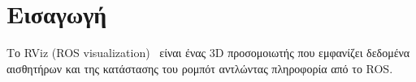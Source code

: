 \section{Εισαγωγή}
Το RViz (ROS visualization)~\cite{rviz} είναι ένας 3D προσομοιωτής που εμφανίζει δεδομένα αισθητήρων και της κατάστασης του ρομπότ αντλώντας πληροφορία από το ROS.
